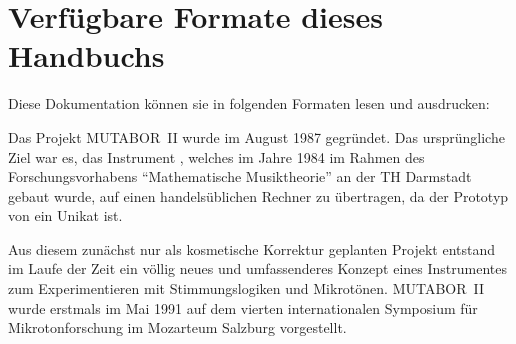 
\subject{Programmier- und Bedienungshandbuch}
%
%
%
\ifhtml
\setcounter{tocdepth}{1}
\fi

\maketitle
\ifhtml\ifhelp\else
\section*{Verfügbare Formate dieses Handbuchs}
Diese Dokumentation können sie in folgenden Formaten lesen und ausdrucken:

\fi
\else
\tableofcontents
\fi

Das Projekt MUTABOR~II wurde im August 1987
gegründet. Das ursprüngliche Ziel war es, das Instrument \mutabor{},
welches im Jahre 1984 im Rahmen des Forschungsvorhabens
"`Mathematische Musiktheorie"' an der TH Darmstadt gebaut wurde, auf
einen handels\-üblichen Rechner zu übertragen, da der Prototyp von
\mutabor{} ein Unikat ist.

Aus diesem zunächst nur als kosmetische Korrektur geplanten Projekt
entstand im Laufe der Zeit ein völlig neues und umfassenderes Konzept
eines Instrumentes zum Experimentieren mit Stimmungslogiken und
Mikrotönen. MUTABOR~II wurde erstmals im Mai 1991 auf dem vierten
internationalen Symposium für Mikrotonforschung im Mozarteum Salzburg
vorgestellt.

